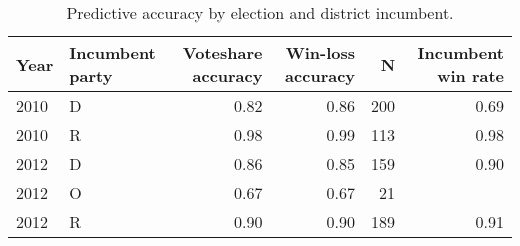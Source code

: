 \begin{table*}[ht]
\centering
\begin{tabular}{llrrrr}
  \hline
Year & Incumbent party & Voteshare accuracy & Win-loss accuracy & N & Incumbent win rate \\ 
  \hline
2010 & D & 0.82 & 0.86 & 200 & 0.69 \\ 
  2010 & R & 0.98 & 0.99 & 113 & 0.98 \\ 
  2012 & D & 0.86 & 0.85 & 159 & 0.90 \\ 
  2012 & O & 0.67 & 0.67 & 21 &  \\ 
  2012 & R & 0.90 & 0.90 & 189 & 0.91 \\ 
   \hline
\end{tabular}
\caption{Predictive accuracy by election and district incumbent.} 
\label{tab:accuracy-by-incumbency}
\end{table*}
